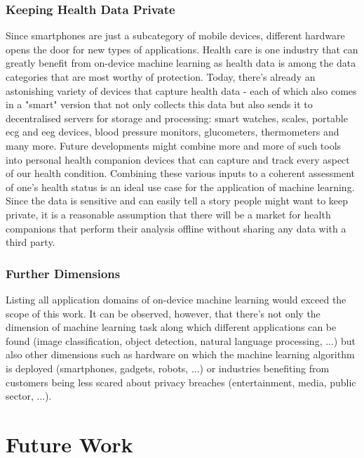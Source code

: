 \documentclass[
			   fontsize=11pt,
               paper=a4,
               bibliography=totoc,
               idxtotoc,
               headsepline,
               footsepline,
               footinclude=false,
               BCOR=12mm,
               DIV=13,
               openany,   %
               ]
               {scrbook}
\begin{document}
\subsubsection{Keeping Health Data Private}
Since smartphones are just a subcategory of mobile devices, different hardware opens the door for new types of applications. Health care is one industry that can greatly benefit from on-device machine learning as health data is among the data categories that are most worthy of protection. Today, there's already an astonishing variety of devices that capture health data - each of which also comes in a "smart" version that not only collects this data but also sends it to decentralised servers for storage and processing: smart watches, scales, portable \gls{ecg} and \gls{eeg} devices, blood pressure monitors, glucometers, thermometers and many more. Future developments might combine more and more of such tools into personal health companion devices that can capture and track every aspect of our health condition. Combining these various inputs to a coherent assessment of one's health status is an ideal use case for the application of machine learning. Since the data is sensitive and can easily tell a story people might want to keep private, it is a reasonable assumption that there will be a market for health companions that perform their analysis offline without sharing any data with a third party.

\subsubsection{Further Dimensions}
Listing all application domains of on-device machine learning would exceed the scope of this work. It can be observed, however, that there's not only the dimension of machine learning task along which different applications can be found (image classification, object detection, natural language processing, ...) but also other dimensions such as hardware on which the machine learning algorithm is deployed (smartphones, gadgets, robots, ...) or industries benefiting from customers being less scared about privacy breaches (entertainment, media, public sector, ...).


\section{Future Work}
\end{document}
